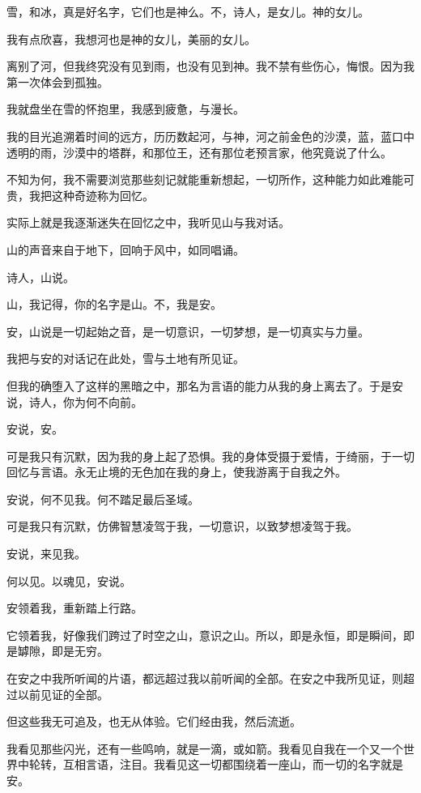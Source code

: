 \documentclass[UTF8]{article}
\begin{document}
\par 雪，和冰，真是好名字，它们也是神么。不，诗人，是女儿。神的女儿。
\par 我有点欣喜，我想河也是神的女儿，美丽的女儿。
\\[0.6cm]
\par 离别了河，但我终究没有见到雨，也没有见到神。我不禁有些伤心，悔恨。因为我第一次体会到孤独。
\par 我就盘坐在雪的怀抱里，我感到疲惫，与漫长。
\par 我的目光追溯着时间的远方，历历数起河，与神，河之前金色的沙漠，蓝，蓝口中透明的雨，沙漠中的塔群，和那位王，还有那位老预言家，他究竟说了什么。
\par 不知为何，我不需要浏览那些刻记就能重新想起，一切所作，这种能力如此难能可贵，我把这种奇迹称为回忆。
\par 实际上就是我逐渐迷失在回忆之中，我听见山与我对话。
\par 山的声音来自于地下，回响于风中，如同唱诵。
\par 诗人，山说。
\par 山，我记得，你的名字是山。不，我是安。
\par 安，山说是一切起始之音，是一切意识，一切梦想，是一切真实与力量。
\\[0.6cm]
\par 我把与安的对话记在此处，雪与土地有所见证。
\par 但我的确堕入了这样的黑暗之中，那名为言语的能力从我的身上离去了。于是安说，诗人，你为何不向前。
\par 安说，安。
\par 可是我只有沉默，因为我的身上起了恐惧。我的身体受摄于爱情，于绮丽，于一切回忆与言语。永无止境的无色加在我的身上，使我游离于自我之外。
\par 安说，何不见我。何不踏足最后圣域。
\par 可是我只有沉默，仿佛智慧凌驾于我，一切意识，以致梦想凌驾于我。
\par 安说，来见我。
\par 何以见。以魂见，安说。
\\[0.6cm]
\par 安领着我，重新踏上行路。
\par 它领着我，好像我们跨过了时空之山，意识之山。所以，即是永恒，即是瞬间，即是罅隙，即是无穷。
\par 在安之中我所听闻的片语，都远超过我以前听闻的全部。在安之中我所见证，则超过以前见证的全部。
\par 但这些我无可追及，也无从体验。它们经由我，然后流逝。
\par 我看见那些闪光，还有一些鸣响，就是一滴，或如箭。我看见自我在一个又一个世界中轮转，互相言语，注目。我看见这一切都围绕着一座山，而一切的名字就是安。
\end{document}
